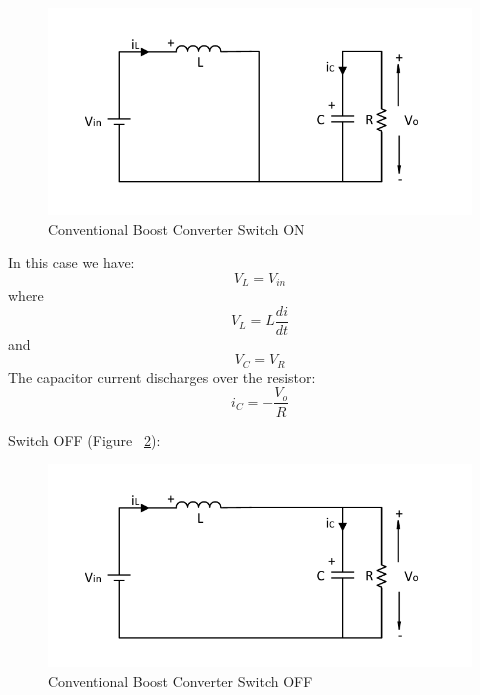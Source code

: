 \begin{figure}[H]
   \centering
   \includegraphics[width=\textwidth]{figures/aConventionalBoost/ConventionalBoostConverterON.pdf}
    \caption{Conventional Boost Converter Switch ON}
	\label{fig:CBC_ON}
\end{figure}

In this case we have:
\begin{equation}
	V_L = V_{in}
	\label{eq:CBC_SWON1}
\end{equation}
where
\begin{equation}
	V_L = L \frac{di}{dt}
	\label{eq:CBC_SWON2}
\end{equation}
and
\begin{equation}
	V_C = V_R
	\label{eq:CBC_SWON3}
\end{equation}
The capacitor current discharges over the resistor:
\begin{equation}
	i_C = -\frac{V_o}{R}
	\label{eq:CBC_SWON4}
\end{equation}


Switch OFF (Figure ~\ref{fig:CBC_OFF}):

\begin{figure}[H]
   \centering
   \includegraphics[width=\textwidth]{figures/aConventionalBoost/ConventionalBoostConverterOFF.pdf}
    \caption{Conventional Boost Converter Switch OFF}
	\label{fig:CBC_OFF}
\end{figure}

